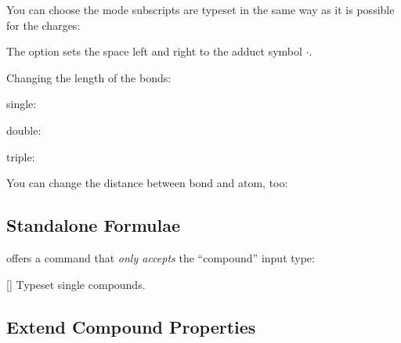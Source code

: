 \documentclass[load-preamble+]{cnltx-doc}
\begin{document}
You can choose the mode subscripts are typeset in the same way as it is
possible for the charges:
\begin{example}
    \par
   
\end{example}

The option  sets the space left and right to the adduct
symbol $\cdot$.
\begin{example}
   \par
\end{example}

Changing the length of the bonds:
\begin{example}
  single:  \par
  double:  \par
  triple: 
\end{example}

You can change the distance between bond and atom, too:
\begin{example}
   \par
\end{example}

\subsection{Standalone Formulae}
\chemformula{} offers a command that \emph{only accepts} the
\enquote{compound} input type:
\begin{commands}
  []
    Typeset single compounds.
\end{commands}

\subsection{Extend Compound Properties}\label{sec:extend-comp-prop}
\end{document}
